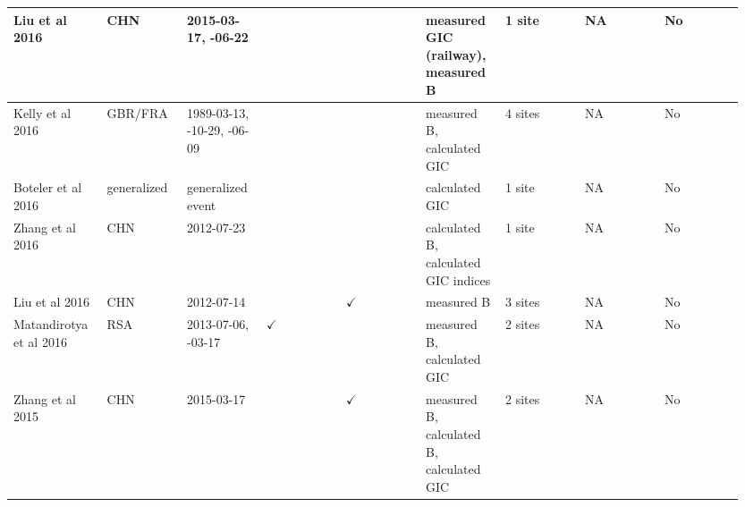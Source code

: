 \begin{longtable}{p{0.106\linewidth}p{0.106\linewidth}p{0.106\linewidth}p{0.106\linewidth}p{0.106\linewidth}p{0.106\linewidth}p{0.106\linewidth}p{0.106\linewidth}p{0.106\linewidth}}
Liu et al 2016 & CHN & 2015-03-17, \newline 2015-06-22 &  &  & measured GIC (railway), \newline measured B & 1 site & NA & No \\ \hline
Kelly et al 2016 & GBR/FRA & 1989-03-13, \newline 2003-10-29, \newline 1991-06-09 &  &  & measured B, \newline calculated GIC & 4 sites & NA & No \\ \hline
Boteler et al 2016 & generalized & generalized event &  &  & calculated GIC & 1 site & NA & No \\ \hline
Zhang et al 2016 & CHN & 2012-07-23 &  &  & calculated B, \newline calculated GIC indices & 1 site & NA & No \\ \hline
Liu et al 2016 & CHN & 2012-07-14 &  & $\checkmark$ & measured B & 3 sites & NA & No \\ \hline
Matandirotya et al 2016 & RSA & 2013-07-06, \newline 2015-03-17 & $\checkmark$ &  & measured B, \newline calculated GIC & 2 sites & NA & No \\ \hline
Zhang et al 2015 & CHN & 2015-03-17 &  & $\checkmark$ & measured B, \newline calculated B, \newline calculated GIC & 2 sites & NA & No \\ \hline
\end{longtable}